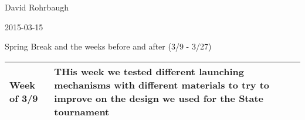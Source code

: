 David Rohrbaugh

2015-03-15

Spring Break and the weeks before and after (3/9 - 3/27)

\begin{tabular}{|p{5cm}|p{5cm}|}
 \hline
 Week of 3/9&
 THis week we tested different launching mechanisms with different materials to try to improve on the design we used for the State tournament
  \\
 \hline
\end{tabular}
